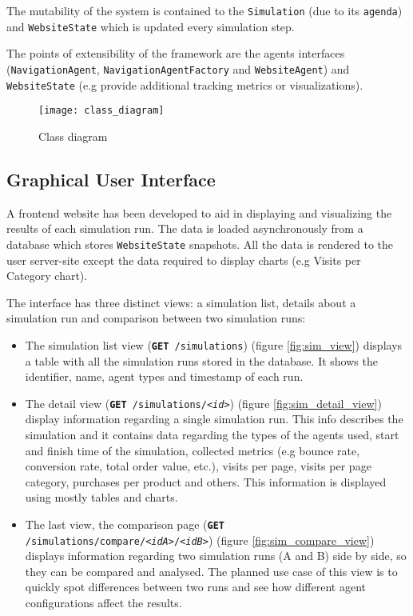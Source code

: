 The mutability of the system is contained to the \texttt{Simulation} (due to 
its \texttt{agenda}) and \texttt{WebsiteState} which is updated every 
simulation step.

The points of extensibility of the framework are the agents interfaces 
(\texttt{NavigationAgent}, \texttt{NavigationAgentFactory} and 
\texttt{WebsiteAgent}) and \texttt{WebsiteState} (e.g provide additional 
tracking metrics or visualizations).

\begin{figure}[p]
    \begin{center}
        \leavevmode
        \texttt{[image: class\_diagram]}
        \caption{Class diagram}
        \label{fig:class}
    \end{center}
\end{figure}

\subsection{Graphical User Interface}

A frontend website has been developed to aid in displaying and visualizing the 
results of each simulation run. The data is loaded asynchronously from a 
database which stores \texttt{WebsiteState} snapshots. All the data is rendered 
to the user server-site except the data required to display charts (e.g Visits 
per Category chart).

The interface has three distinct views: a simulation list, details about a 
simulation run and comparison between two simulation runs:

\begin{itemize}
    \item The simulation list view (\texttt{\textbf{GET} /simulations}) (figure 
    \ref{fig:sim_view}) displays a table 
    with all the simulation runs stored in the database. It shows the 
    identifier, name, agent types and timestamp of each run.
    \item The detail view (\texttt{\textbf{GET} /simulations/\textit{<id>}}) 
    (figure \ref{fig:sim_detail_view})
    display information regarding a single simulation run. This info describes 
    the simulation and it contains data regarding the types of the agents used, 
    start and finish time of the simulation, collected metrics (e.g bounce 
    rate, conversion rate, total order value, etc.), visits per page, visits 
    per page category, purchases per product and others. This information is 
    displayed using mostly tables and charts.
    \item The last view, the comparison page (\texttt{\textbf{GET} 
    /simulations/compare/\textit{<idA>}/\textit{<idB>}}) (figure 
    \ref{fig:sim_compare_view}) displays information 
    regarding two simulation runs (A and B) side by side, so they can be 
    compared and analysed. The planned use case of this view is to quickly spot 
    differences between two runs and see how different agent configurations 
    affect the results.
\end{itemize}



